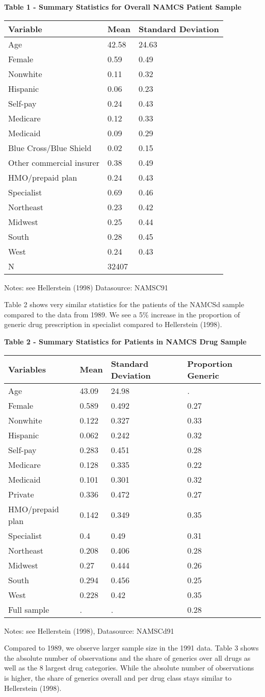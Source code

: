 \documentclass[
]{book}
\begin{document}
\textbf{Table 1 - Summary Statistics for Overall NAMCS Patient Sample}

\begin{longtable}[]{@{}lll@{}}
\toprule
Variable & Mean & Standard Deviation\tabularnewline
\midrule
\endhead
Age & 42.58 & 24.63\tabularnewline
Female & 0.59 & 0.49\tabularnewline
Nonwhite & 0.11 & 0.32\tabularnewline
Hispanic & 0.06 & 0.23\tabularnewline
Self-pay & 0.24 & 0.43\tabularnewline
Medicare & 0.12 & 0.33\tabularnewline
Medicaid & 0.09 & 0.29\tabularnewline
Blue Cross/Blue Shield & 0.02 & 0.15\tabularnewline
Other commercial insurer & 0.38 & 0.49\tabularnewline
HMO/prepaid plan & 0.24 & 0.43\tabularnewline
Specialist & 0.69 & 0.46\tabularnewline
Northeast & 0.23 & 0.42\tabularnewline
Midwest & 0.25 & 0.44\tabularnewline
South & 0.28 & 0.45\tabularnewline
West & 0.24 & 0.43\tabularnewline
N & 32407 &\tabularnewline
\bottomrule
\end{longtable}

Notes: see Hellerstein (1998) Datasource: NAMSC91

Table 2 shows very similar statistics for the patients of the NAMCSd
sample compared to the data from 1989. We see a 5\% increase in the
proportion of generic drug prescription in specialist compared to
Hellerstein (1998).

\textbf{Table 2 - Summary Statistics for Patients in NAMCS Drug Sample}

\begin{longtable}[]{@{}llll@{}}
\toprule
Variables & Mean & Standard Deviation & Proportion
Generic\tabularnewline
\midrule
\endhead
Age & 43.09 & 24.98 & .\tabularnewline
Female & 0.589 & 0.492 & 0.27\tabularnewline
Nonwhite & 0.122 & 0.327 & 0.33\tabularnewline
Hispanic & 0.062 & 0.242 & 0.32\tabularnewline
Self-pay & 0.283 & 0.451 & 0.28\tabularnewline
Medicare & 0.128 & 0.335 & 0.22\tabularnewline
Medicaid & 0.101 & 0.301 & 0.32\tabularnewline
Private & 0.336 & 0.472 & 0.27\tabularnewline
HMO/prepaid plan & 0.142 & 0.349 & 0.35\tabularnewline
Specialist & 0.4 & 0.49 & 0.31\tabularnewline
Northeast & 0.208 & 0.406 & 0.28\tabularnewline
Midwest & 0.27 & 0.444 & 0.26\tabularnewline
South & 0.294 & 0.456 & 0.25\tabularnewline
West & 0.228 & 0.42 & 0.35\tabularnewline
Full sample & . & . & 0.28\tabularnewline
\bottomrule
\end{longtable}

Notes: see Hellerstein (1998), Datasource: NAMSCd91

Compared to 1989, we observe larger sample size in the 1991 data. Table
3 shows the absolute number of observations and the share of generics
over all drugs as well as the 8 largest drug categories. While the
absolute number of observations is higher, the share of generics overall
and per drug class stays similar to Hellerstein (1998).
\end{document}
